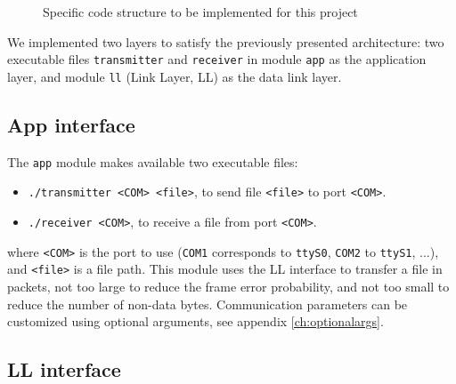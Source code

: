 \documentclass[a4paper, 11pt]{report}
\begin{document}
\begin{figure}[H]
	\caption{Specific code structure to be implemented for this project}
\end{figure}

We implemented two layers to satisfy the previously presented architecture: two executable files \texttt{transmitter} and \texttt{receiver} in module \texttt{app} as the application layer, and module \texttt{ll} (Link Layer, LL) as the data link layer.

\subsection{App interface}

The \texttt{app} module makes available two executable files:
\begin{itemize}
	\itemsep0em
	\item \texttt{./transmitter <COM> <file>}, to send file \texttt{<file>} to port \texttt{<COM>}.
	\item \texttt{./receiver <COM>}, to receive a file from port \texttt{<COM>}.
\end{itemize}
where \texttt{<COM>} is the port to use (\texttt{COM1} corresponds to \texttt{ttyS0}, \texttt{COM2} to \texttt{ttyS1}, ...), and \texttt{<file>} is a file path. This module uses the LL interface to transfer a file in packets, not too large to reduce the frame error probability, and not too small to reduce the number of non-data bytes. Communication parameters can be customized using optional arguments, see appendix \ref{ch:optionalargs}.

\subsection{LL interface}
\end{document}
